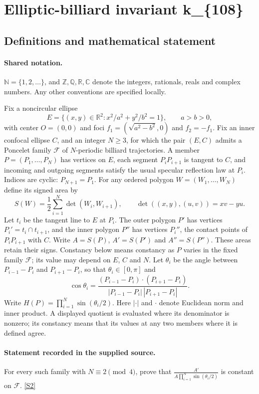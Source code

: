 \documentclass[11pt]{article}
\newcommand{\sref}[2]{\hyperlink{source:#1:#2}{[S#2]}}
\begin{document}
\section{Elliptic-billiard invariant k\_\{108\}}\label{statement}

\subsection{Definitions and mathematical statement}

\paragraph{Shared notation.}$\mathbb N=\{1,2,\ldots\}$, and $\mathbb Z,\mathbb Q,\mathbb R,\mathbb C$ denote the integers, rationals, reals and complex numbers. Any other conventions are specified locally.


Fix a noncircular ellipse
\[
E=\{(x,y)\in\mathbb R^2:x^2/a^2+y^2/b^2=1\},\qquad a>b>0,
\]
with center $O=(0,0)$ and foci $f_1=(\sqrt{a^2-b^2},0)$ and $f_2=-f_1$. Fix an inner confocal ellipse $C$, and an integer $N\geq3$, for which the pair $(E,C)$ admits a Poncelet family $\mathcal F$ of $N$-periodic billiard trajectories. A member $P=(P_1,\ldots,P_N)$ has vertices on $E$, each segment $P_iP_{i+1}$ is tangent to $C$, and incoming and outgoing segments satisfy the usual specular reflection law at $P_i$. Indices are cyclic: $P_{N+1}=P_1$.
For any ordered polygon $W=(W_1,\ldots,W_N)$ define its signed area by
\[
S(W)=\frac12\sum_{i=1}^N\det(W_i,W_{i+1}),\qquad
\det((x,y),(u,v))=xv-yu.
\]
Let $t_i$ be the tangent line to $E$ at $P_i$. The outer polygon $P'$ has vertices $P_i'=t_i\cap t_{i+1}$, and the inner polygon $P''$ has vertices $P_i''$, the contact points of $P_iP_{i+1}$ with $C$. Write $A=S(P)$, $A'=S(P')$ and $A''=S(P'')$. These areas retain their signs. Constancy below means constancy as $P$ varies in the fixed family $\mathcal F$; its value may depend on $E$, $C$ and $N$.
Let $\theta_i$ be the angle between $P_{i-1}-P_i$ and $P_{i+1}-P_i$, so that $\theta_i\in[0,\pi]$ and
\[
\cos\theta_i=\frac{(P_{i-1}-P_i)\cdot(P_{i+1}-P_i)}{|P_{i-1}-P_i|\,|P_{i+1}-P_i|}.
\]
Write $H(P)=\prod_{i=1}^N\sin(\theta_i/2)$. Here $|\cdot|$ and $\cdot$ denote Euclidean norm and inner product.
A displayed quotient is evaluated where its denominator is nonzero; its constancy means that its values at any two members where it is defined agree.
\paragraph{Statement recorded in the supplied source.}
For every such family with $N\equiv2\pmod4$, prove that $\displaystyle \frac{A'}{A\prod_{i=1}^N\sin(\theta_i/2)}$ is constant on $\mathcal F$. \sref{statement}{2}
\end{document}
